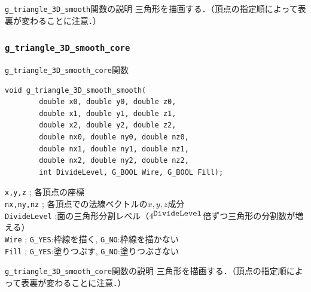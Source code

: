 \documentclass[platex,a4paper,12pt]{jsarticle}%
\begin{document}
\begin{itembox}[l]{\texttt{g\_triangle\_3D\_smooth}関数の説明}
三角形を描画する．（頂点の指定順によって表裏が変わることに注意．）
\end{itembox}

\begin{figure}[htb]
\end{figure}


\clearpage
\subsubsection{\texttt{g\_triangle\_3D\_smooth\_core}}

\begin{itembox}[l]{\texttt{g\_triangle\_3D\_smooth\_core}関数}
\begin{verbatim}
void g_triangle_3D_smooth_smooth(
        double x0, double y0, double z0,
        double x1, double y1, double z1,
        double x2, double y2, double z2,
        double nx0, double ny0, double nz0,
        double nx1, double ny1, double nz1,
        double nx2, double ny2, double nz2,
        int DivideLevel, G_BOOL Wire, G_BOOL Fill);  
\end{verbatim}
\verb|x,y,z| ; 各頂点の座標\\
\verb|nx,ny,nz| ; 各頂点での法線ベクトルの$x,y,z$成分\\
\verb|DivideLevel| ;面の三角形分割レベル（$4^{\verb|DivideLevel|}$倍ずつ三角形の分割数が増える）\\
\verb|Wire| ; \verb|G_YES|:枠線を描く, \verb|G_NO|:枠線を描かない \\
\verb|Fill| ; \verb|G_YES|:塗りつぶす, \verb|G_NO|:塗りつぶさない 
\end{itembox}

\begin{itembox}[l]{\texttt{g\_triangle\_3D\_smooth\_core}関数の説明}
三角形を描画する．（頂点の指定順によって表裏が変わることに注意．）
\end{itembox}
\end{document}
